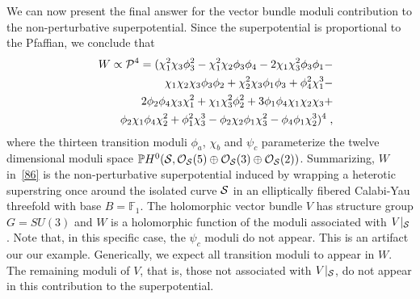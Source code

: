 \documentclass[a4paper,12pt]{article}
\numberwithin{equation}{section}
\theoremstyle{plain}
\begin{document}
We can now present the final answer for the vector bundle moduli
contribution
to the non-perturbative superpotential. Since the superpotential is
proportional to the Pfaffian, we conclude that
%
\begin{eqnarray}
&&W \propto {\cal{P}}^{4} =
(\chi_1^2 \chi_3 \phi_3^2 -
\chi_1^2 \chi_2 \phi_3 \phi_4 -
2\chi_1 \chi_3^2  \phi_3 \phi_1 - \nonumber \\
&&\chi_1 \chi_2 \chi_3  \phi_3 \phi_2 +
\chi_2^2 \chi_3  \phi_1 \phi_3 +
\phi_4^2 \chi_1^3 -              \nonumber \\
&&2 \phi_2 \phi_4 \chi_3 \chi_1^2  +
\chi_1 \chi_3^2 \phi_2^2 +
3 \phi_1 \phi_4 \chi_1 \chi_2 \chi_3 + \nonumber \\
&&\phi_2 \chi_1 \phi_4 \chi_2^2 +
\phi_1^2 \chi_3^3 -
\phi_2 \chi_2 \phi_1 \chi_3^2-
\phi_4 \phi_1 \chi_2^3)^{4} \; ,
\label{86}
\end{eqnarray}
where the thirteen transition moduli $\phi_{a}$, $\chi_{b}$ and $\psi_{c}$
parameterize the twelve dimensional moduli space ${\mathbb P}H^{0}
({\cal S}, {\cal O}_{{\cal S}}(5) \oplus {\cal O}_{{\cal S}}(3) \oplus
{\cal O}_{{\cal S}}(2))$. Summarizing, $W$ in~\eqref{86} is the
non-perturbative superpotential induced by wrapping a heterotic
superstring
once around the isolated curve ${\cal{S}}$ in an elliptically fibered
Calabi-Yau threefold with base $B={\mathbb F}_{1}$. The holomorphic vector
bundle $V$ has structure group $G=SU(3)$ and $W$ is a holomorphic function
of
the moduli associated with $V|_{{\cal{S}}}$. Note that, in this specific
case, the
$\psi_{c}$ moduli do not appear. This is an artifact
our our example. Generically, we expect all transition moduli to appear in
$W$.
The remaining moduli of $V$, that is, those not associated with
$V|_{{\cal{S}}}$, do not appear in this contribution to the
superpotential.
\end{document}
